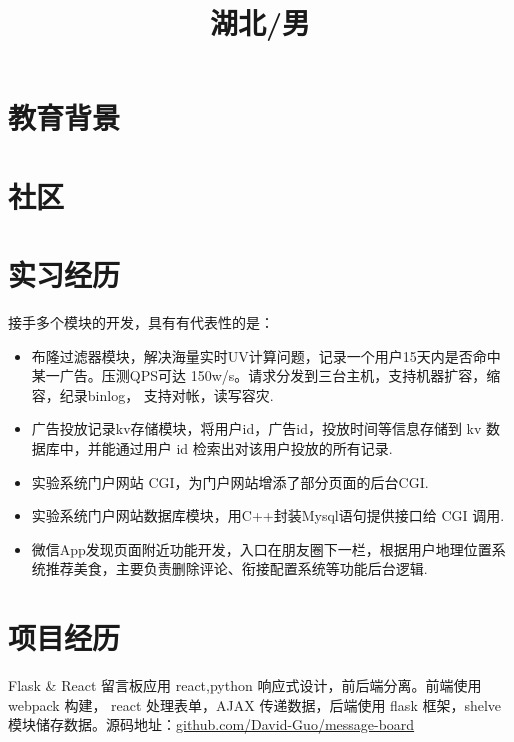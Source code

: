 \documentclass[14pt,a4paper]{moderncv}
\title{\textbf{湖北/男}}
\begin{document}
\maketitle
\vspace{-3em}      %

\section{\textbf{教育背景}}
\vspace{-1em}

\section{\textbf{社区}}
\vspace{-1em}      %

\section{\textbf{实习经历}}
{接手多个模块的开发，具有有代表性的是：
\begin{itemize}
\item 布隆过滤器模块，解决海量实时UV计算问题，记录一个用户15天内是否命中某一广告。压测QPS可达 150w/s。请求分发到三台主机，支持机器扩容，缩容，纪录binlog， 支持对帐，读写容灾.
\item 广告投放记录kv存储模块，将用户id，广告id，投放时间等信息存储到 kv 数据库中，并能通过用户 id 检索出对该用户投放的所有记录.
\item 实验系统门户网站 CGI，为门户网站增添了部分页面的后台CGI.
\item 实验系统门户网站数据库模块，用C++封装Mysql语句提供接口给 CGI 调用.
\item 微信App发现页面附近功能开发，入口在朋友圈下一栏，根据用户地理位置系统推荐美食，主要负责删除评论、衔接配置系统等功能后台逻辑.
\end{itemize}
}

\section{\textbf{项目经历}}
{Flask \& React 留言板应用}
{react,python}
{}{}
{响应式设计，前后端分离。前端使用 webpack 构建， react 处理表单，AJAX 传递数据，后端使用 flask 框架，shelve 模块储存数据。源码地址：\url{github.com/David-Guo/message-board}}
\end{document}
